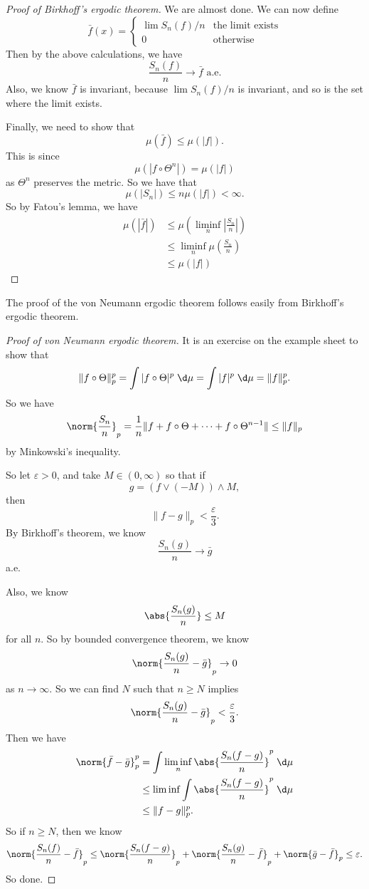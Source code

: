 \documentclass[a4paper]{article}
\begin{document}
\begin{proof}[Proof of Birkhoff's ergodic theorem]
  We are almost done. We can now define
  \[
    \bar{f}(x) =
    \begin{cases}
      \lim S_n(f)/n & \text{the limit exists}\\
      0 & \text{otherwise}
    \end{cases}
  \]
  Then by the above calculations, we have
  \[
    \frac{S_n(f)}{n} \to \bar{f}\text{ a.e.}
  \]
  Also, we know $\bar{f}$ is invariant, because $\lim S_n(f)/n$ is invariant, and so is the set where the limit exists.

  Finally, we need to show that
  \[
    \mu(\bar{f}) \leq \mu(|f|).
  \]
  This is since
  \[
    \mu(|f \circ \Theta^n|) = \mu(|f|)
  \]
  as $\Theta^n$ preserves the metric. So we have that
  \[
    \mu(|S_n|) \leq n \mu(|f|) < \infty.
  \]
  So by Fatou's lemma, we have
  \begin{align*}
    \mu(|\bar{f}|) &\leq \mu\left(\liminf_n \left|\frac{S_n}{n}\right|\right)\\
    &\leq \liminf_n \mu\left(\frac{S_n}{n}\right)\\
    &\leq \mu(|f|)
  \end{align*}
\end{proof}

The proof of the von Neumann ergodic theorem follows easily from Birkhoff's ergodic theorem.
\begin{proof}[Proof of von Neumann ergodic theorem]
  It is an exercise on the example sheet to show that
  \[
    \|f \circ \Theta\|_p^p = \int |f \circ \Theta|^p \;\d \mu = \int |f|^p \;\d \mu = \|f\|_p^p.
  \]
  So we have
  \[
    \norm{\frac{S_n}{n}}_p = \frac{1}{n} \|f + f \circ \Theta + \cdots + f \circ \Theta^{n - 1}\| \leq \|f\|_p
  \]
  by Minkowski's inequality.

  So let $\varepsilon > 0$, and take $M \in (0, \infty)$ so that if
  \[
    g = (f \vee (-M)) \wedge M,
  \]
  then
  \[
    \|f - g\|_p < \frac{\varepsilon}{3}.
  \]
  By Birkhoff's theorem, we know
  \[
    \frac{S_n(g)}{n} \to \bar{g}
  \]
  a.e.

  Also, we know
  \[
    \abs{\frac{S_n(g)}{n}} \leq M
  \]
  for all $n$. So by bounded convergence theorem, we know
  \[
    \norm{\frac{S_n(g)}{n} - \bar{g}}_p \to 0
  \]
  as $n \to \infty$. So we can find $N$ such that $n \geq N$ implies
  \[
    \norm{\frac{S_n(g)}{n} - \bar{g}}_p < \frac{\varepsilon}{3}.
  \]
  Then we have
  \begin{align*}
    \norm{\bar{f} - \bar{g}}_p^p &= \int \liminf_n \abs{\frac{S_n(f - g)}{n}}^p \;\d \mu\\
    &\leq \liminf \int \abs{\frac{S_n(f - g)}{n}}^p \;\d\mu\\
    &\leq \|f - g\|_p^p.
  \end{align*}
  So if $n \geq N$, then we know
  \[
    \norm{\frac{S_n(f)}{n} - \bar{f}}_p \leq \norm{\frac{S_n(f - g)}{n}}_p + \norm{\frac{S_n(g)}{n} - \bar{f}}_p + \norm{\bar{g} - \bar{f}}_p \leq \varepsilon.
  \]
  So done.
\end{proof}
\end{document}
